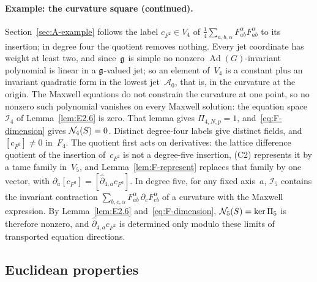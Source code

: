 \paragraph{Example: the curvature square (continued).}\label{F:curvature-square-example} Section~\ref{sec:A-example} follows the label $c_{F^2}\in V_4$ of $\frac14\sum_{a,b,\alpha}F^\alpha_{ab}F^\alpha_{ab}$ to its insertion; in degree four the quotient removes nothing. Every jet coordinate has weight at least two, and since~$\mathfrak{g}$ is simple no nonzero $\operatorname{Ad}(G)$-invariant polynomial is linear in a $\mathfrak{g}$-valued jet; so an element of~$V_4$ is a constant plus an invariant quadratic form in the lowest jet~$\mathcal A_0$, that is, in the curvature at the origin. The Maxwell equations do not constrain the curvature at one point, so no nonzero such polynomial vanishes on every Maxwell solution: the equation space~$\mathcal I_4$ of Lemma~\ref{lem:E2.6} is zero. That lemma gives $\Pi_{4,N,p}=1$, and~\eqref{eq:F-dimension} gives $\mathcal{N}_{4}(S)=0$. Distinct degree-four labels give distinct fields, and $[c_{F^2}]\ne0$ in~$F_4$. The quotient first acts on derivatives: the lattice difference quotient of the insertion of~$c_{F^2}$ is not a degree-five insertion, (C2) represents it by a tame family in~$V_5$, and Lemma~\ref{lem:F-represent} replaces that family by one vector, with $\partial_a[c_{F^2}]=[\hat\partial_{4,a}c_{F^2}]$. In degree five, for any fixed axis~$a$, $\mathcal I_5$ contains the invariant contraction $\sum_{b,c,\alpha}F^\alpha_{ab}\,\partial_cF^\alpha_{cb}$ of a curvature with the Maxwell expression. By Lemma~\ref{lem:E2.6} and~\eqref{eq:F-dimension}, $\mathcal{N}_{5}(S)=\ker\Pi_5$ is therefore nonzero, and $\hat\partial_{4,a}c_{F^2}$ is determined only modulo these limits of transported equation directions.

\subsection{Euclidean properties}\label{sec:partII-F.4}

